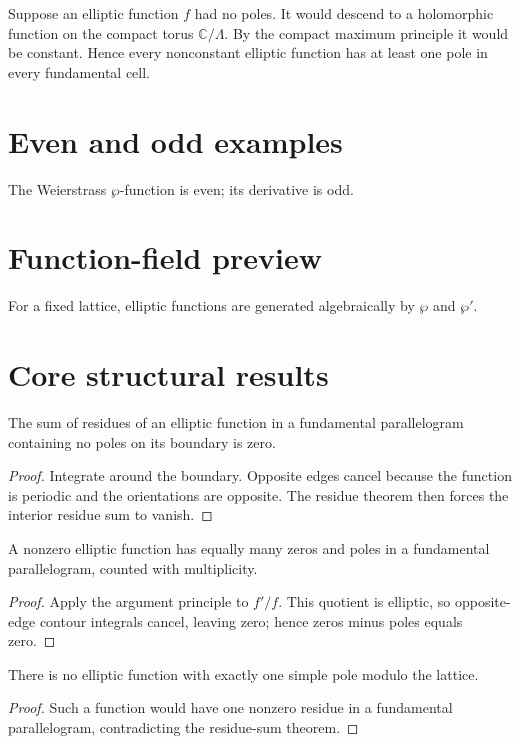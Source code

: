 \begin{example}\label{ex:iv28-expand-03}
Suppose an elliptic function \(f\) had no poles. It would descend to a holomorphic function on the compact torus \(\mathbb C/\Lambda\). By the compact maximum principle it would be constant. Hence every nonconstant elliptic function has at least one pole in every fundamental cell.
\end{example}
\section{Even and odd examples}
The Weierstrass $\wp$-function is even; its derivative is odd.

\section{Function-field preview}
For a fixed lattice, elliptic functions are generated algebraically by $\wp$ and $\wp'$.

\section{Core structural results}

\begin{theorem}\label{thm:iv28-01}
The sum of residues of an elliptic function in a fundamental parallelogram containing no poles on its boundary is zero.
\begin{proof}
Integrate around the boundary. Opposite edges cancel because the function is periodic and the orientations are opposite. The residue theorem then forces the interior residue sum to vanish.
\end{proof}
\end{theorem}

\begin{theorem}\label{thm:iv28-02}
A nonzero elliptic function has equally many zeros and poles in a fundamental parallelogram, counted with multiplicity.
\begin{proof}
Apply the argument principle to $f'/f$. This quotient is elliptic, so opposite-edge contour integrals cancel, leaving zero; hence zeros minus poles equals zero.
\end{proof}
\end{theorem}

\begin{theorem}\label{thm:iv28-03}
There is no elliptic function with exactly one simple pole modulo the lattice.
\begin{proof}
Such a function would have one nonzero residue in a fundamental parallelogram, contradicting the residue-sum theorem.
\end{proof}
\end{theorem}

